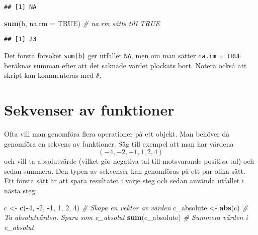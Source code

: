 \documentclass[
]{book}
\newenvironment{Shaded}{\begin{snugshade}}{\end{snugshade}}
\newcommand{\AttributeTok}[1]{\textcolor[rgb]{0.13,0.29,0.53}{#1}}
\newcommand{\CommentTok}[1]{\textcolor[rgb]{0.56,0.35,0.01}{\textit{#1}}}
\newcommand{\ConstantTok}[1]{\textcolor[rgb]{0.56,0.35,0.01}{#1}}
\newcommand{\DecValTok}[1]{\textcolor[rgb]{0.00,0.00,0.81}{#1}}
\newcommand{\FunctionTok}[1]{\textcolor[rgb]{0.13,0.29,0.53}{\textbf{#1}}}
\newcommand{\NormalTok}[1]{#1}
\newcommand{\OtherTok}[1]{\textcolor[rgb]{0.56,0.35,0.01}{#1}}
\newcommand{\SpecialCharTok}[1]{\textcolor[rgb]{0.81,0.36,0.00}{\textbf{#1}}}
\theoremstyle{definition}
\theoremstyle{definition}
\theoremstyle{definition}
\theoremstyle{definition}
\theoremstyle{remark}
\begin{document}
\begin{verbatim}
## [1] NA
\end{verbatim}

\begin{Shaded}
\begin{Highlighting}[]
\FunctionTok{sum}\NormalTok{(b, }\AttributeTok{na.rm =} \ConstantTok{TRUE}\NormalTok{)                   }\CommentTok{\# na.rm sätts till TRUE}
\end{Highlighting}
\end{Shaded}

\begin{verbatim}
## [1] 23
\end{verbatim}

Det första försöket \texttt{sum(b)} ger utfallet \texttt{NA}, men om man sätter \texttt{na.rm\ =\ TRUE} beräknas summan efter att det saknade värdet plockats bort. Notera också att skript kan kommenteras med \texttt{\#}.

\hypertarget{sekvenser-av-funktioner}{%
\section{Sekvenser av funktioner}\label{sekvenser-av-funktioner}}

Ofta vill man genomföra flera operationer på ett objekt. Man behöver då genomföra en sekvens av funktioner. Säg till exempel att man har värdena \[(-4, -2, -1, 1, 2, 4)\] och vill ta absolutvärde (vilket gör negativa tal till motsvarande positiva tal) och sedan summera.
Den typen av sekvenser kan genomföras på ett par olika sätt. Ett första sätt är att spara resultatet i varje steg och sedan använda utfallet i nästa steg:

\begin{Shaded}
\begin{Highlighting}[]
\NormalTok{c }\OtherTok{\textless{}{-}} \FunctionTok{c}\NormalTok{(}\SpecialCharTok{{-}}\DecValTok{4}\NormalTok{, }\SpecialCharTok{{-}}\DecValTok{2}\NormalTok{, }\SpecialCharTok{{-}}\DecValTok{1}\NormalTok{, }\DecValTok{1}\NormalTok{, }\DecValTok{2}\NormalTok{, }\DecValTok{4}\NormalTok{)            }\CommentTok{\# Skapa en vektor av värden}
\NormalTok{c\_absolute }\OtherTok{\textless{}{-}} \FunctionTok{abs}\NormalTok{(c)                   }\CommentTok{\# Ta absolutvärden. Spara som c\_absolut}
\FunctionTok{sum}\NormalTok{(c\_absolute)                        }\CommentTok{\# Summera värden i c\_absolut}
\end{Highlighting}
\end{Shaded}
\end{document}
